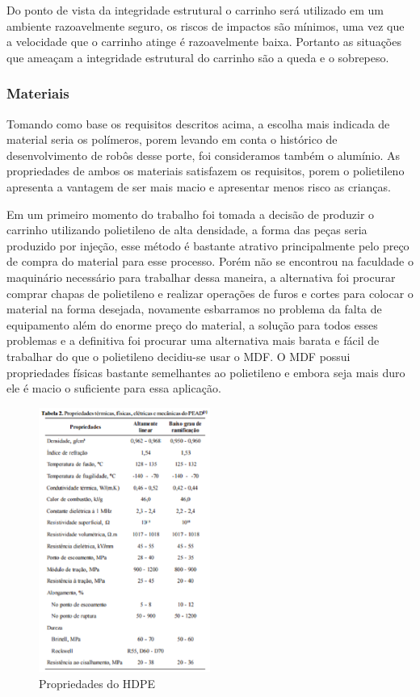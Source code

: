 Do ponto de vista da integridade estrutural o carrinho será utilizado em um ambiente razoavelmente seguro, os riscos
de impactos são mínimos, uma vez que a velocidade que o carrinho atinge é razoavelmente baixa. Portanto as situações que
ameaçam a integridade estrutural do carrinho são a queda e o sobrepeso.

\subsubsection{Materiais}

Tomando como base os requisitos descritos acima, a escolha mais indicada de material seria os polímeros, porem levando em
conta o histórico de desenvolvimento de robôs desse porte, foi consideramos também o alumínio. As propriedades de ambos os materiais
satisfazem os requisitos, porem o polietileno apresenta a vantagem de ser mais macio e apresentar menos risco as crianças.

Em um primeiro momento do trabalho foi tomada a decisão de produzir o carrinho utilizando polietileno de alta densidade, a
forma das peças seria produzido por injeção, esse método é bastante atrativo principalmente pelo preço de compra do material
para esse processo. Porém não se encontrou na faculdade o maquinário necessário para trabalhar dessa maneira, a alternativa foi
procurar comprar chapas de polietileno e realizar operações de furos e cortes para colocar o material na forma desejada, novamente
esbarramos no problema da falta de equipamento além do enorme preço do material, a solução para todos esses problemas e a
definitiva foi procurar uma alternativa mais barata e fácil de trabalhar do que o polietileno decidiu-se usar o MDF. O MDF
possui propriedades físicas bastante semelhantes ao polietileno e embora seja mais duro ele é macio o suficiente para essa aplicação.

\begin{figure}[H]
    \centering
    \includegraphics[width=0.5\textwidth]{figuras/pp_HDPE.eps}
    \caption{Propriedades do HDPE}
    \label{fig:pp_HDPE}
\end{figure}


